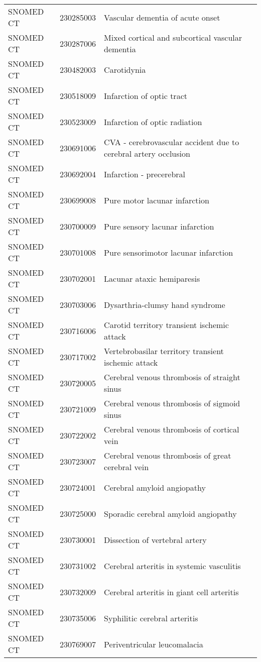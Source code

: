 \begin{longtable}{p{}p{}p{}}
  SNOMED CT & 230285003 & Vascular dementia of acute onset \\ 
  SNOMED CT & 230287006 & Mixed cortical and subcortical vascular dementia \\ 
  SNOMED CT & 230482003 & Carotidynia \\ 
  SNOMED CT & 230518009 & Infarction of optic tract \\ 
  SNOMED CT & 230523009 & Infarction of optic radiation \\ 
  SNOMED CT & 230691006 & CVA - cerebrovascular accident due to cerebral artery occlusion \\ 
  SNOMED CT & 230692004 & Infarction - precerebral \\ 
  SNOMED CT & 230699008 & Pure motor lacunar infarction \\ 
  SNOMED CT & 230700009 & Pure sensory lacunar infarction \\ 
  SNOMED CT & 230701008 & Pure sensorimotor lacunar infarction \\ 
  SNOMED CT & 230702001 & Lacunar ataxic hemiparesis \\ 
  SNOMED CT & 230703006 & Dysarthria-clumsy hand syndrome \\ 
  SNOMED CT & 230716006 & Carotid territory transient ischemic attack \\ 
  SNOMED CT & 230717002 & Vertebrobasilar territory transient ischemic attack \\ 
  SNOMED CT & 230720005 & Cerebral venous thrombosis of straight sinus \\ 
  SNOMED CT & 230721009 & Cerebral venous thrombosis of sigmoid sinus \\ 
  SNOMED CT & 230722002 & Cerebral venous thrombosis of cortical vein \\ 
  SNOMED CT & 230723007 & Cerebral venous thrombosis of great cerebral vein \\ 
  SNOMED CT & 230724001 & Cerebral amyloid angiopathy \\ 
  SNOMED CT & 230725000 & Sporadic cerebral amyloid angiopathy \\ 
  SNOMED CT & 230730001 & Dissection of vertebral artery \\ 
  SNOMED CT & 230731002 & Cerebral arteritis in systemic vasculitis \\ 
  SNOMED CT & 230732009 & Cerebral arteritis in giant cell arteritis \\ 
  SNOMED CT & 230735006 & Syphilitic cerebral arteritis \\ 
  SNOMED CT & 230769007 & Periventricular leucomalacia \\ 

\end{longtable}
